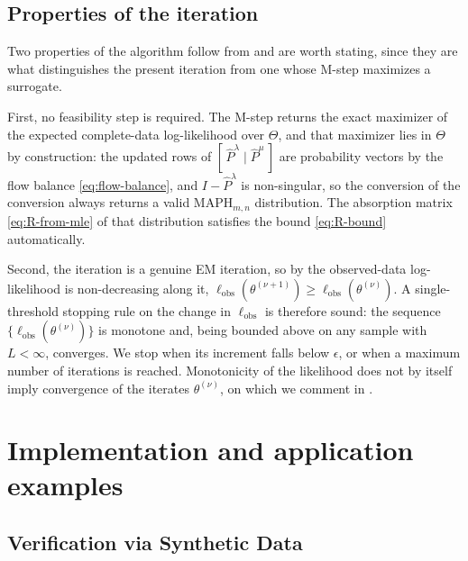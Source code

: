 \documentclass{article}
\newenvironment{subrevision}{}{}
\begin{document}
\begin{subrevision}
\subsection{Properties of the iteration}
\label{sec:em-properties}

Two properties of the algorithm follow from  and are worth stating, since they
are what distinguishes the present iteration from one whose M-step maximizes a surrogate.

First, no feasibility step is required. The M-step returns the exact maximizer of the expected
complete-data log-likelihood over $\Theta$, and that maximizer lies in $\Theta$ by construction: the
updated rows of $[\,\widehat P^\lambda \mid \widehat P^\mu\,]$ are probability vectors by the flow
balance \eqref{eq:flow-balance}, and $I-\widehat P^\lambda$ is non-singular, so the conversion of
the conversion always returns a valid $\text{MAPH}_{m,n}$ distribution. The absorption matrix
\eqref{eq:R-from-mle} of that distribution satisfies the bound \eqref{eq:R-bound} automatically.

Second, the iteration is a genuine EM iteration, so by  the observed-data
log-likelihood is non-decreasing along it,
$\ell_{\mathrm{obs}}(\theta^{(\nu+1)}) \ge \ell_{\mathrm{obs}}(\theta^{(\nu)})$. A single-threshold
stopping rule on the change in $\ell_{\mathrm{obs}}$ is therefore sound: the sequence
$\{\ell_{\mathrm{obs}}(\theta^{(\nu)})\}$ is monotone and, being bounded above on any sample with
$L<\infty$, converges. We stop when its increment falls below $\epsilon$, or when a maximum number
of iterations is reached. Monotonicity of the likelihood does not by itself imply convergence of the
iterates $\theta^{(\nu)}$, on which we comment in .
\end{subrevision}

\section{Implementation and application examples}
\label{sec:impl}

\subsection{Verification via Synthetic Data}
\label{sec:verification}
\end{document}
